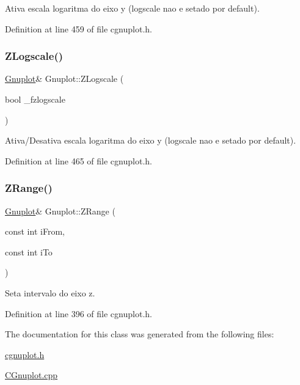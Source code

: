 Ativa escala logaritma do eixo y (logscale nao e setado por default). 



Definition at line 459 of file cgnuplot.\+h.

\mbox{\label{class_gnuplot_af0157431e784eead31de6eb4e3e5d095}} 
\subsubsection{\texorpdfstring{Z\+Logscale()}{ZLogscale()}\hspace{0.1cm}{\footnotesize\ttfamily [2/2]}}
{\footnotesize\ttfamily \hyperlink{class_gnuplot}{Gnuplot}\& Gnuplot\+::\+Z\+Logscale (\begin{DoxyParamCaption}\item[{bool}]{\+\_\+fzlogscale }\end{DoxyParamCaption})\hspace{0.3cm}{\ttfamily [inline]}}



Ativa/\+Desativa escala logaritma do eixo y (logscale nao e setado por default). 



Definition at line 465 of file cgnuplot.\+h.

\mbox{\label{class_gnuplot_a8331c7ee5d65be5f4d88922a0b2f5d35}} 
\subsubsection{\texorpdfstring{Z\+Range()}{ZRange()}}
{\footnotesize\ttfamily \hyperlink{class_gnuplot}{Gnuplot}\& Gnuplot\+::\+Z\+Range (\begin{DoxyParamCaption}\item[{const int}]{i\+From,  }\item[{const int}]{i\+To }\end{DoxyParamCaption})\hspace{0.3cm}{\ttfamily [inline]}}



Seta intervalo do eixo z. 



Definition at line 396 of file cgnuplot.\+h.



The documentation for this class was generated from the following files\+:\begin{DoxyCompactItemize}
\item 
\hyperlink{cgnuplot_8h}{cgnuplot.\+h}\item 
\hyperlink{_c_gnuplot_8cpp}{C\+Gnuplot.\+cpp}\end{DoxyCompactItemize}
